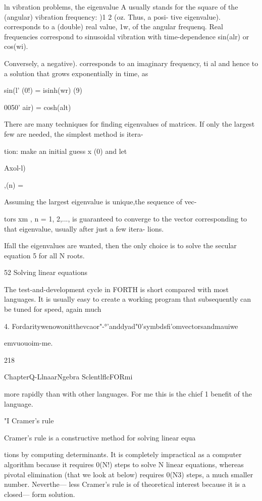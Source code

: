 {ln vibration problems, the eigenvalue A usually stands for the
square of the (angular) vibration frequency: )1 2 (oz. Thus, a posi-
tive eigenvalue). corresponds to a (double) real value, 1w, of the
angular frequenq. Real frequencies correspond to sinusoidal
vibration with time-dependence sin(alr) or cos(wi).

Conversely, a negative). corresponds to an imaginary frequency,
ti al and hence to a solution that grows exponentially in time, as

sin(l' (0!) = isinh(wr)
(9)

0050' air) = cosh(alt)

There are many techniques for ﬁnding eigenvalues of matrices.
If only the largest few are needed, the simplest method is itera-

tion: make an initial guess x (0) and let

Axol-l)

,(n) =

Assuming the largest eigenvalue is unique,the sequence of vec-

tors xm , n = 1, 2,..., is guaranteed to converge to the vector
corresponding to that eigenvalue, usually after just a few itera-
lions.

Ifall the eigenvalues are wanted, then the only choice is to solve
the secular equation 5 for all N roots.

52 Solving linear equations

The test-and-development cycle in FORTH is short compared
with most languages. It is usually easy to create a working
program that subsequently can be tuned for speed, again much

 

4. Fordaritywenowonitthevcaor"-°'anddyad"0'symbdsﬁ'omvectorsandmauiwe

emvuouoim-me.

218

ChapterQ-LlnaarNgebra SclentlflcFORmi

more rapidly than with other languages. For me this is the chief 1
beneﬁt of the language.

"I Cramer's rule

Cramer's rule is a constructive method for solving linear equa

tions by computing determinants. It is completely impractical
as a computer algorithm because it requires 0(N!) steps to solve
N linear equations, whereas pivotal elimination (that we look at
below) requires 0(N3) steps, a much smaller number. Neverthe—
less Cramer's rule is of theoretical interest because it is a closed—
form solution.

}
